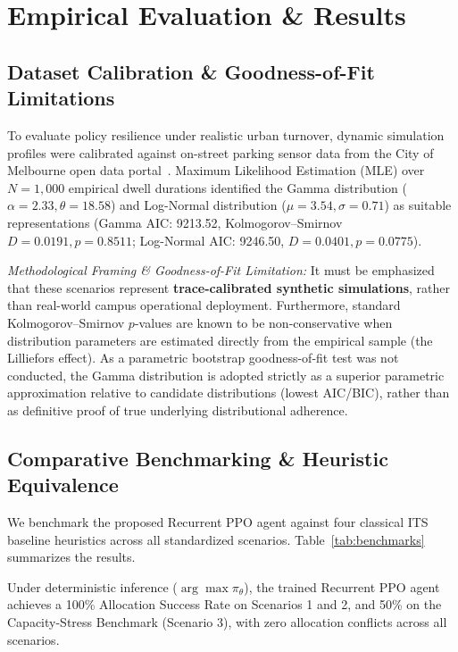 \documentclass[journal]{IEEEtran}
\begin{document}
\section{Empirical Evaluation \& Results}

\subsection{Dataset Calibration \& Goodness-of-Fit Limitations}
To evaluate policy resilience under realistic urban turnover, dynamic simulation profiles were calibrated against on-street parking sensor data from the City of Melbourne open data portal~\cite{melbourne2024sensors}. Maximum Likelihood Estimation (MLE) over $N=1,000$ empirical dwell durations identified the Gamma distribution ($\alpha = 2.33, \theta = 18.58$) and Log-Normal distribution ($\mu = 3.54, \sigma = 0.71$) as suitable representations (Gamma AIC: 9213.52, Kolmogorov--Smirnov $D = 0.0191, p = 0.8511$; Log-Normal AIC: 9246.50, $D = 0.0401, p = 0.0775$).

\textit{Methodological Framing \& Goodness-of-Fit Limitation:} It must be emphasized that these scenarios represent \textbf{trace-calibrated synthetic simulations}, rather than real-world campus operational deployment. Furthermore, standard Kolmogorov--Smirnov $p$-values are known to be non-conservative when distribution parameters are estimated directly from the empirical sample (the Lilliefors effect). As a parametric bootstrap goodness-of-fit test was not conducted, the Gamma distribution is adopted strictly as a superior parametric approximation relative to candidate distributions (lowest AIC/BIC), rather than as definitive proof of true underlying distributional adherence.

\subsection{Comparative Benchmarking \& Heuristic Equivalence}
We benchmark the proposed Recurrent PPO agent against four classical ITS baseline heuristics across all standardized scenarios. Table~\ref{tab:benchmarks} summarizes the results.

Under deterministic inference ($\arg\max \pi_\theta$), the trained Recurrent PPO agent achieves a 100\% Allocation Success Rate on Scenarios 1 and 2, and 50\% on the Capacity-Stress Benchmark (Scenario 3), with zero allocation conflicts across all scenarios. 
\end{document}
